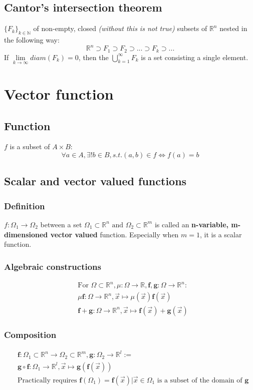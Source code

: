 \documentclass[11pt, a4paper]{article}
\begin{document}
    \subsection{Cantor's intersection theorem}
    $\{F_k \}_{k \in \mathbb{N}}$ of non-empty, closed \textit{(without this is not true)} subsets of $\mathbb{R}^n$ nested in the following way:
    $$\mathbb{R}^n \supset F_1 \supset F_2 \supset ... \supset F_k \supset ...$$
    If $\lim\limits_{k \to \infty} diam(F_k) = 0$, then the $\bigcup\limits_{k = 1}^{\infty} F_k$ is a set consisting a single element. 
\section{Vector function}
    \subsection{Function}
    $f$ is a subset of $A \times B:$
    $$\forall a \in A, \exists! b \in B, s.t. (a, b) \in f \Leftrightarrow f(a) = b$$
    \subsection{Scalar and vector valued functions}
        \subsubsection{Definition}
        $f: \Omega_1 \to \Omega_2$ between a set $\Omega_1 \subset \mathbb{R}^n \text{ and } \Omega_2 \subset \mathbb{R}^m$ is called an \textbf{n-variable, m-dimensioned vector valued} function. Especially when $m = 1$, it is a scalar function.
        \subsubsection{Algebraic constructions}
        $$\begin{aligned}
            &\text{For } \Omega \subset \mathbb{R}^n, \mu: \Omega \to \mathbb{R}, \bm{f}, \bm{g}: \Omega \to \mathbb{R}^n: \\
            &\mu\bm{f}: \Omega \to \mathbb{R}^n, \vec{x} \mapsto \mu(\vec{x})\bm{f}(\vec{x}) \\
            &\bm{f} + \bm{g}: \Omega \to \mathbb{R}^n, \vec{x} \mapsto \bm{f}(\vec{x}) + \bm{g}(\vec{x})
        \end{aligned}$$
        \subsubsection{Composition}
        $$\begin{aligned}
            &\bm{f}: \Omega_1 \subset \mathbb{R}^n \to \Omega_2 \subset \mathbb{R}^m, \bm{g}: \Omega_2 \to \mathbb{R}^l := \\
            &\bm{g} \circ \bm{f}: \Omega_1 \to \mathbb{R}^l, \vec{x} \mapsto \bm{g}(\bm{f}(\vec{x})) \\
            &\text{Practically requires } \bm{f}(\Omega_1) = {\bm{f}(\vec{x}) | \vec{x} \in \Omega_1} \text{ is a subset of the domain of } \bm{g}
        \end{aligned}$$
\end{document}
